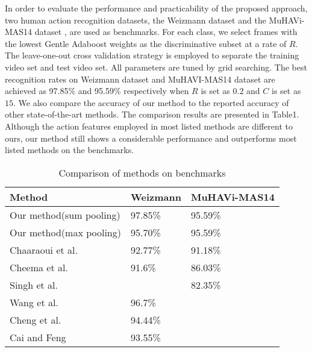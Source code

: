 \documentclass{article}
\begin{document}
In order to evaluate the performance and practicability of the proposed approach,
two human action recognition datasets, the Weizmann dataset \cite{ActionsAsSpaceTimeShapes_pami07} and the MuHAVi-MAS14 dataset \cite{Singh}, are used
as benchmarks.
For each class, we select frames with the lowest Gentle Adaboost weights as the discriminative subset at a rate of $R$.
The leave-one-out cross validation strategy is employed to separate the training video set and test video set.
All parameters are tuned by grid searching.
The best recognition rates on Weizmann dataset and MuHAVI-MAS14 dataset are achieved as 97.85\% and 95.59\% respectively when  $R$ is set as $0.2$ and  $C$ is set as $15$.
We also compare the accuracy of our method to the reported accuracy of  other state-of-the-art methods.
The comparison results are presented in Table1.
Although the action features employed in most listed methods are different to ours, our method still shows a considerable performance and outperforms most listed methods on the benchmarks.


\begin{table}[htbp]
  \centering
  \caption{Comparison of methods  on benchmarks}
    \begin{tabular}{p{4.5cm} p{1.5cm} p{1.5cm}}
    \toprule
    Method &  Weizmann &  MuHAVi-MAS14\\
    \midrule
    Our method(sum pooling) & 97.85\% & 95.59\%\\
   Our method(max pooling) & 95.70\% & 95.59\%\\
    Chaaraoui et al. \cite{Chaaraoui2013} & 92.77\% & 91.18\% \\
    Cheema et al. \cite{Cheema}  & 91.6\% & 86.03\%\\
        Singh et al. \cite{Singh}  &  & 82.35\%\\
       Wang et al. \cite{Wang20123902} & 96.7\% &  \\
    Cheng et al. \cite{ChengTIP2015} & 94.44\% &  \\
       Cai and Feng \cite{frftacpr2015} & 93.55\% &  \\
        \bottomrule
    \end{tabular}%
  \label{tab:recresult}%
\end{table}%
\end{document}
